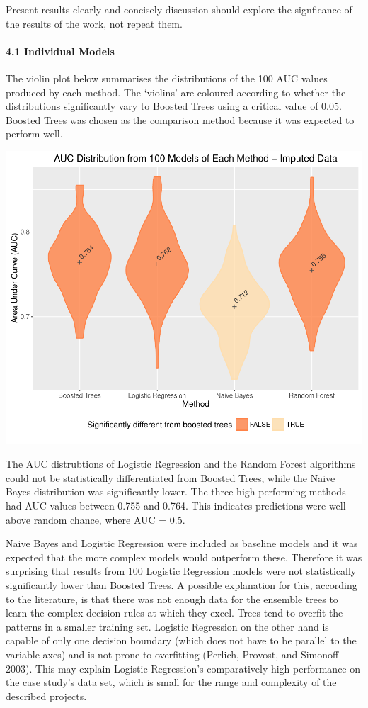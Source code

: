 \documentclass[]{elsarticle} %
\makeatletter
\def\maxwidth{\ifdim\Gin@nat@width>\linewidth\linewidth
\else\Gin@nat@width\fi}
\let\Oldincludegraphics\includegraphics
\renewcommand{\includegraphics}[1]{\Oldincludegraphics[width=\maxwidth]{#1}}
\makeatother
\begin{document}
Present results clearly and concisely discussion should explore the
signficance of the results of the work, not repeat them.

\paragraph{4.1 Individual Models}\label{individual-models}

The violin plot below summarises the distributions of the 100 AUC values
produced by each method. The `violins' are coloured according to whether
the distributions significantly vary to Boosted Trees using a critical
value of 0.05. Boosted Trees was chosen as the comparison method because
it was expected to perform well.

\includegraphics{Consulting_Profitability_Paper_files/figure-latex/mice_violin-1.pdf}

The AUC distrubtions of Logistic Regression and the Random Forest
algorithms could not be statistically differentiated from Boosted Trees,
while the Naive Bayes distribution was significantly lower. The three
high-performing methods had AUC values between 0.755 and 0.764. This
indicates predictions were well above random chance, where AUC = 0.5.

Naive Bayes and Logistic Regression were included as baseline models and
it was expected that the more complex models would outperform these.
Therefore it was surprising that results from 100 Logistic Regression
models were not statistically significantly lower than Boosted Trees. A
possible explanation for this, according to the literature, is that
there was not enough data for the ensemble trees to learn the complex
decision rules at which they excel. Trees tend to overfit the patterns
in a smaller training set. Logistic Regression on the other hand is
capable of only one decision boundary (which does not have to be
parallel to the variable axes) and is not prone to overfitting (Perlich,
Provost, and Simonoff 2003). This may explain Logistic Regression's
comparatively high performance on the case study's data set, which is
small for the range and complexity of the described projects.
\end{document}
